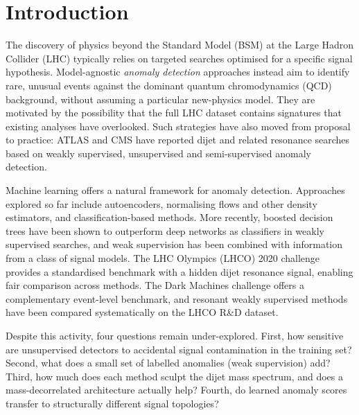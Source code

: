 \documentclass[11pt,a4paper]{article}
\begin{document}
\section{Introduction}

The discovery of physics beyond the Standard Model (BSM) at the Large
Hadron Collider (LHC) typically relies on targeted searches optimised
for a specific signal hypothesis. Model-agnostic \emph{anomaly
detection} approaches instead aim to identify rare, unusual events
against the dominant quantum chromodynamics (QCD) background, without assuming a
particular new-physics model.\cite{Karagiorgi2022,Belis2024} They are motivated by the
possibility that the full LHC dataset contains signatures that existing
analyses have overlooked. Such strategies have also moved from proposal to
practice: ATLAS and CMS have reported dijet and related resonance searches based on
weakly supervised, unsupervised and semi-supervised anomaly
detection.\cite{ATLAS2020,ATLAS2023,ATLAS2024,ATLAS2025,CMS2025}

Machine learning offers a natural framework for anomaly detection.
Approaches explored so far include
autoencoders,\cite{Hajer2020,Heimel2019,Farina2020,Cerri2019,Blance2019,Finke2021}
normalising flows and other density
estimators,\cite{Nachman2020,Andreassen2020,Hallin2022} and classification-based
methods.\cite{Metodiev2017,Collins2018,Collins2019,DAgnolo2019}
More recently, boosted decision trees have been shown to outperform deep
networks as classifiers in weakly supervised searches,\cite{Finke2024} and weak
supervision has been combined with information from a class of signal
models.\cite{Cheng2025}
The LHC Olympics (LHCO) 2020 challenge\cite{Kasieczka2021} provides
a standardised benchmark with a hidden dijet resonance signal, enabling
fair comparison across methods. The Dark Machines challenge\cite{Aarrestad2022}
offers a complementary event-level benchmark, and resonant weakly supervised methods
have been compared systematically on the LHCO R\&D dataset.\cite{Golling2024}

Despite this activity, four questions remain under-explored.
First, how sensitive are unsupervised detectors to accidental signal
contamination in the training set? Second, what does a
small set of labelled anomalies (weak supervision) add? Third, how much does each method
sculpt the dijet mass spectrum, and does a mass-decorrelated
architecture actually help? Fourth, do learned anomaly scores transfer
to structurally different signal topologies?
\end{document}
